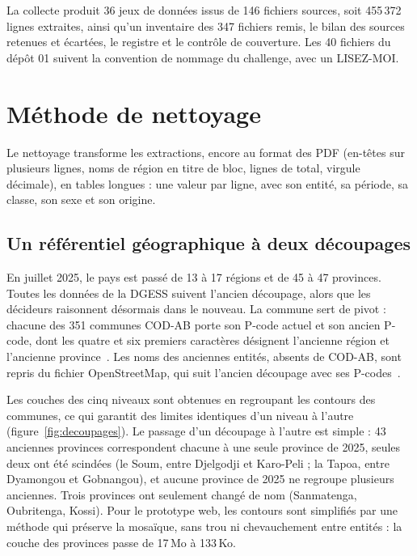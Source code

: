 \documentclass{article}
\begin{document}
La collecte produit 36 jeux de données issus de 146 fichiers sources, soit 455\,372 lignes extraites, ainsi qu'un inventaire des 347 fichiers remis, le bilan des sources retenues et écartées, le registre et le contrôle de couverture. Les 40 fichiers du dépôt 01 suivent la convention de nommage du challenge, avec un LISEZ-MOI.

\section{Méthode de nettoyage}

Le nettoyage transforme les extractions, encore au format des PDF (en-têtes sur plusieurs lignes, noms de région en titre de bloc, lignes de total, virgule décimale), en tables longues : une valeur par ligne, avec son entité, sa période, sa classe, son sexe et son origine.

\subsection{Un référentiel géographique à deux découpages}

En juillet 2025, le pays est passé de 13 à 17 régions et de 45 à 47 provinces. Toutes les données de la DGESS suivent l'ancien découpage, alors que les décideurs raisonnent désormais dans le nouveau. La commune sert de pivot : chacune des 351 communes COD-AB porte son P-code actuel et son ancien P-code, dont les quatre et six premiers caractères désignent l'ancienne région et l'ancienne province~\cite{codab}. Les noms des anciennes entités, absents de COD-AB, sont repris du fichier OpenStreetMap, qui suit l'ancien découpage avec ses P-codes~\cite{hotosm}.

Les couches des cinq niveaux sont obtenues en regroupant les contours des communes, ce qui garantit des limites identiques d'un niveau à l'autre (figure~\ref{fig:decoupages}). Le passage d'un découpage à l'autre est simple : 43 anciennes provinces correspondent chacune à une seule province de 2025, seules deux ont été scindées (le Soum, entre Djelgodji et Karo-Peli ; la Tapoa, entre Dyamongou et Gobnangou), et aucune province de 2025 ne regroupe plusieurs anciennes. Trois provinces ont seulement changé de nom (Sanmatenga, Oubritenga, Kossi). Pour le prototype web, les contours sont simplifiés par une méthode qui préserve la mosaïque, sans trou ni chevauchement entre entités : la couche des provinces passe de 17\,Mo à 133\,Ko.
\end{document}
